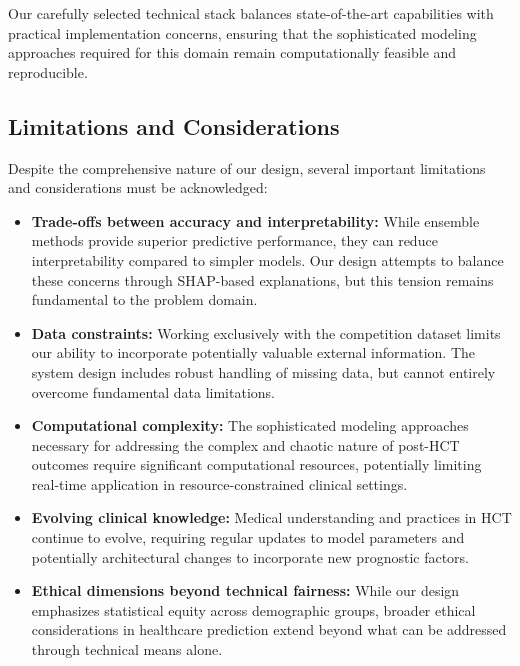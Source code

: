 Our carefully selected technical stack balances state-of-the-art capabilities with practical implementation concerns, ensuring that the sophisticated modeling approaches required for this domain remain computationally feasible and reproducible.

\subsection{Limitations and Considerations}

Despite the comprehensive nature of our design, several important limitations and considerations must be acknowledged:

\begin{itemize}
    \item \textbf{Trade-offs between accuracy and interpretability:} While ensemble methods provide superior predictive performance, they can reduce interpretability compared to simpler models. Our design attempts to balance these concerns through SHAP-based explanations, but this tension remains fundamental to the problem domain.
    
    \item \textbf{Data constraints:} Working exclusively with the competition dataset limits our ability to incorporate potentially valuable external information. The system design includes robust handling of missing data, but cannot entirely overcome fundamental data limitations.
    
    \item \textbf{Computational complexity:} The sophisticated modeling approaches necessary for addressing the complex and chaotic nature of post-HCT outcomes require significant computational resources, potentially limiting real-time application in resource-constrained clinical settings.
    
    \item \textbf{Evolving clinical knowledge:} Medical understanding and practices in HCT continue to evolve, requiring regular updates to model parameters and potentially architectural changes to incorporate new prognostic factors.
    
    \item \textbf{Ethical dimensions beyond technical fairness:} While our design emphasizes statistical equity across demographic groups, broader ethical considerations in healthcare prediction extend beyond what can be addressed through technical means alone.
\end{itemize}

